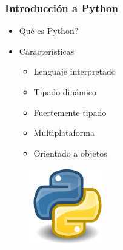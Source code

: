 \begin{frame}[fragile]
  \frametitle{Introducci\'on a Python}
  
  \begin{itemize}
  \item Qu\'e es Python?
  \item Caracter\'isticas
    \begin{itemize}
      
    \item Lenguaje interpretado
      
    \item Tipado din\'amico
      
    \item Fuertemente tipado
      
    \item Multiplataforma
      
    \item Orientado a objetos
      
    \end{itemize}
    
  \end{itemize}

  
  \begin{figure}
    \includegraphics[width=0.3\textwidth]{Imagenes/Python.jpg}
  \end{figure}

\end{frame}
